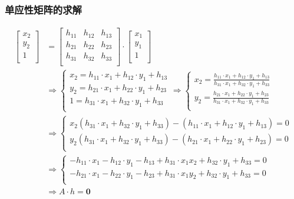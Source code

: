 \documentclass[aspectratio=43]{beamer}
\begin{document}
	\begin{frame}
		\frametitle{单应性矩阵的求解}
			
			\begin{align}
				\left[ \begin{array}{c}
					x_2\\
					y_2\\
					1\\
				\end{array} \right] &=\left[ \begin{matrix}
					h_{11}&		h_{12}&		h_{13}\\
					h_{21}&		h_{22}&		h_{23}\\
					h_{31}&		h_{32}&		h_{33}\\
				\end{matrix} \right] \cdot \left[ \begin{array}{c}
					x_1\\
					y_1\\
					1\\
				\end{array} \right] \nonumber
				\\
				& \Rightarrow \begin{cases}
					x_2=h_{11}\cdot x_1+h_{12}\cdot y_1+h_{13}\\
					y_2=h_{21}\cdot x_1+h_{22}\cdot y_1+h_{23}\\
					1=h_{31}\cdot x_1+h_{32}\cdot y_1+h_{33}\\
				\end{cases}\Rightarrow \begin{cases}
					x_2=\frac{h_{11}\cdot x_1+h_{12}\cdot y_1+h_{13}}{h_{31}\cdot x_1+h_{32}\cdot y_1+h_{33}}\\
					y_2=\frac{h_{21}\cdot x_1+h_{22}\cdot y_1+h_{23}}{h_{31}\cdot x_1+h_{32}\cdot y_1+h_{33}}\\
				\end{cases} \nonumber
				\\
				& \Rightarrow \begin{cases}
					x_2\left( h_{31}\cdot x_1+h_{32}\cdot y_1+h_{33} \right) -\left( h_{11}\cdot x_1+h_{12}\cdot y_1+h_{13} \right) =0\\
					y_2\left( h_{31}\cdot x_1+h_{32}\cdot y_1+h_{33} \right) -\left( h_{21}\cdot x_1+h_{22}\cdot y_1+h_{23} \right) =0\\
				\end{cases} \nonumber
				\\
				& \Rightarrow \begin{cases}
					-h_{11}\cdot x_1-h_{12}\cdot y_1-h_{13}+h_{31}\cdot x_1x_2+h_{32}\cdot y_1+h_{33}=0\\
					-h_{21}\cdot x_1-h_{22}\cdot y_1-h_{23}+h_{31}\cdot x_1y_2+h_{32}\cdot y_1+h_{33}=0\\
				\end{cases}  \nonumber \\
				& \Rightarrow A\cdot h=\boldsymbol{0} \label{线性解法}
			\end{align}	
			
	\end{frame}
	
\end{document}
